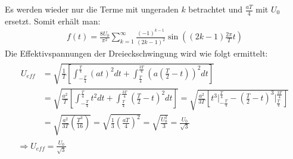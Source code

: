 Es werden wieder nur die Terme mit ungeraden $k$ betrachtet und $\frac{aT}{4}$ mit $U_0$ ersetzt. Somit erhält man:
\begin{gather}
    \boxed{f(t) = \frac{8U_0}{\pi^2} \sum^{\infty}_{k=1} \frac{(-1)^{k-1}}{(2k-1)^2} \sin((2k-1)\frac{2\pi}{T}t)}
\end{gather} 
Die Effektivspannungen der Dreieckschwingung wird wie folgt ermittelt:
\begin{gather}
    \begin{aligned}
        U_{eff} &= \sqrt{\frac{1}{T}\left[\int^{\frac{T}{4}}_{-\frac{T}{4}} (at)^2dt + \int^{\frac{3T}{4}}_{\frac{T}{4}} \left(a\left(\frac{T}{2}-t\right)\right)^2 dt\right]}\\
                &= \sqrt{\frac{a^2}{T}\left[\int^{\frac{T}{4}}_{-\frac{T}{4}} t^2dt + \int^{\frac{3T}{4}}_{\frac{T}{4}} \left(\frac{T}{2}-t\right)^2 dt\right]}
                = \sqrt{\frac{a^2}{3T}\left[t^3 \bigg \vert^{\frac{T}{4}}_{-\frac{T}{4}} - \left(\frac{T}{2}-t\right)^3 \bigg \vert^{\frac{3T}{4}}_{\frac{T}{4}}\right]}\\
                &= \sqrt{\frac{a^2}{3T}\left(\frac{T^3}{16}\right)} = \sqrt{\frac{1}{3}\left(\frac{aT}{4}\right)^2} = \sqrt{\frac{U_0^2}{3}} = \frac{U_0}{\sqrt{3}}
     \end{aligned}\\[0,5cm]
     \Rightarrow\boxed{U_{eff} = \frac{U_0}{\sqrt{3}}}
\end{gather}